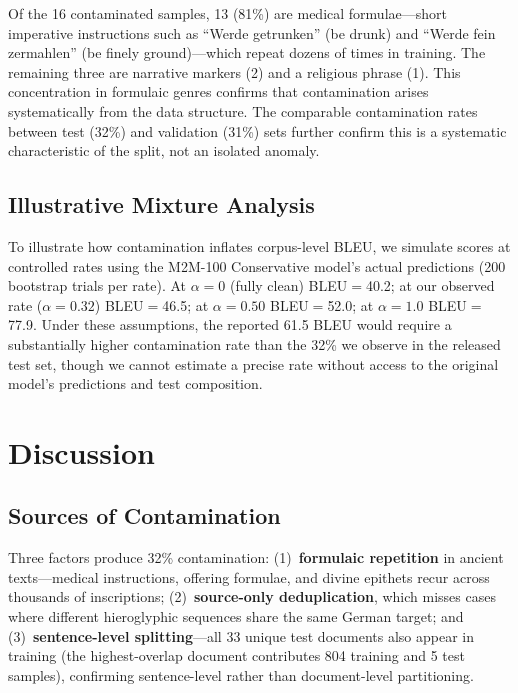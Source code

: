 \documentclass[11pt,a4paper]{article}
\begin{document}
Of the 16 contaminated samples, 13 (81\%) are medical formulae---short imperative instructions such as ``Werde getrunken'' (be drunk) and ``Werde fein zermahlen'' (be finely ground)---which repeat dozens of times in training. The remaining three are narrative markers (2) and a religious phrase (1). This concentration in formulaic genres confirms that contamination arises systematically from the data structure. The comparable contamination rates between test (32\%) and validation (31\%) sets further confirm this is a systematic characteristic of the split, not an isolated anomaly.

\subsection{Illustrative Mixture Analysis}
\label{sec:results-explaining}

To illustrate how contamination inflates corpus-level BLEU, we simulate scores at controlled rates using the M2M-100 Conservative model's actual predictions (200 bootstrap trials per rate). At $\alpha{=}0$ (fully clean) BLEU$=$40.2; at our observed rate ($\alpha{=}0.32$) BLEU$=$46.5; at $\alpha{=}0.50$ BLEU$=$52.0; at $\alpha{=}1.0$ BLEU$=$77.9. Under these assumptions, the reported 61.5 BLEU would require a substantially higher contamination rate than the 32\% we observe in the released test set, though we cannot estimate a precise rate without access to the original model's predictions and test composition.

\section{Discussion}
\label{sec:discussion}

\subsection{Sources of Contamination}
\label{sec:analysis-sources}

Three factors produce 32\% contamination: (1)~\textbf{formulaic repetition} in ancient texts---medical instructions, offering formulae, and divine epithets recur across thousands of inscriptions; (2)~\textbf{source-only deduplication}, which misses cases where different hieroglyphic sequences share the same German target; and (3)~\textbf{sentence-level splitting}---all 33 unique test documents also appear in training (the highest-overlap document contributes 804 training and 5 test samples), confirming sentence-level rather than document-level partitioning.
\end{document}
